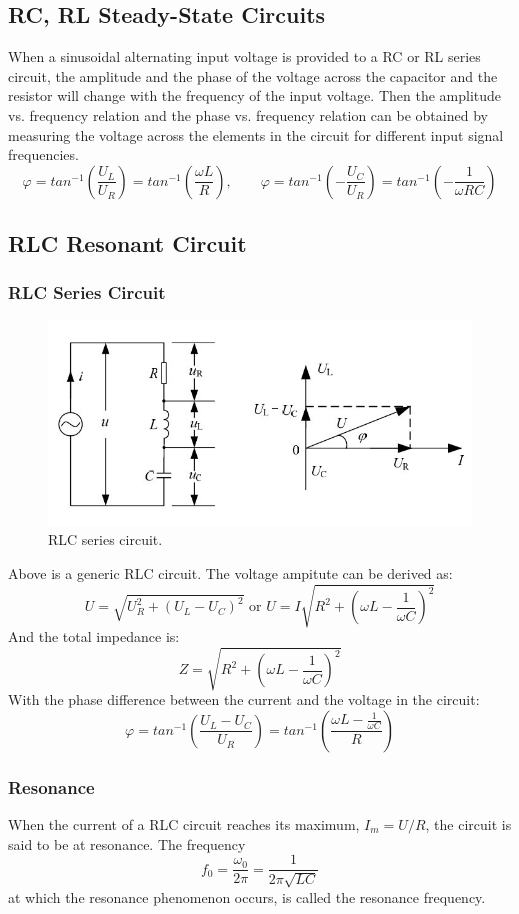 \documentclass[12pt, a4paper]{article}
\begin{document}
\subsection{RC, RL Steady-State Circuits}
When a sinusoidal alternating input voltage is provided to a RC or RL series circuit, 
the amplitude and the phase of the voltage across the capacitor and the resistor will 
change with the frequency of the input voltage. Then the amplitude vs. frequency 
relation and the phase vs. frequency relation can be obtained by measuring the voltage 
across the elements in the circuit for different input signal frequencies.
$$ \varphi=tan^{-1}\left(\dfrac{U_L}{U_R}\right)=tan^{-1}\left(\dfrac{\omega L}{R}\right),\qquad \varphi=tan^{-1}\left(-\dfrac{U_C}{U_R}\right)=tan^{-1}\left(-\dfrac{1}{\omega RC}\right) $$
\subsection{RLC Resonant Circuit}
\subsubsection{RLC Series Circuit}
\begin{figure}[H]
	\centering
	\includegraphics[scale=0.5]{fig4.jpg}
	\caption{RLC series circuit.}
\end{figure}
Above is a generic RLC circuit. The voltage ampitute can be derived as:
$$U=\sqrt{U_R^2+(U_L-U_C)^2} \text{ or } U=I\sqrt{R^2+\left(\omega L-\dfrac{1}{\omega C}\right)^2}$$
And the total impedance is:
$$Z=\sqrt{R^2+\left(\omega L-\dfrac{1}{\omega C}\right)^2}$$
With the phase difference between the current and the voltage in the circuit:
$$\varphi=tan^{-1}\left(\dfrac{U_L-U_C}{U_R}\right)=tan^{-1}\left(\dfrac{\omega L-\frac{1}{\omega C}}{R}\right)$$

\subsubsection{Resonance}
When the current of a RLC circuit reaches its maximum, $ I_m = U/R $, the circuit is said to be at resonance. The frequency
$$ f_0=\dfrac{\omega_0}{2\pi}=\dfrac{1}{2\pi\sqrt{LC}} $$
at which the resonance phenomenon occurs, is called the resonance frequency.
\end{document}
